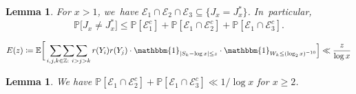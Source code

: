 \documentclass[10pt,a4paper]{article}
\newcommand{\ZZ}{\mathbb{Z}}
\newcommand{\PP}{\mathbb{P}}
\newcommand{\EE}{\mathbb{E}}
\newcommand{\one}{\mathbbm{1}}
\newcommand{\EC}{\mathcal{E}}
\newcommand{\bg}{\big}
\newcommand{\bgg}{\Big}
\newcommand{\bggg}{\bigg}
\theoremstyle{plain}
\newtheorem{lem}[cor]{Lemma}
\theoremstyle{definition}
\begin{document}
\begin{lem}
\label{lem:decomposition J neq J*}
For $x > 1$, we~have $\EC_1\cap \EC_2\cap \EC_3\subseteq \{ J_x = J_x^*\}$. In~particular,
\[
\PP\bg[J_x \ne J_x^*\bg] \le \PP[\EC_1^c] + \PP[\EC_1 \cap \EC_2^c] + \PP[\EC_1 \cap \EC_3^c].
\]
\end{lem}

\begin{equation}
\label{eq:E(z)}
E(z) \coloneqq \EE \bggg[\mathop{\sum\sum\sum}_{\substack{i, j, k \in \ZZ:\ i>j>k}}r(Y_i)r(Y_j) \cdot \one_{|S_k-\log x|\le z} \cdot \one_{W_k \le (\log_2x)^{-10}} \bgg] \ll \frac{z}{\log x}
\end{equation}

\begin{lem}
\label{lem:prob e2c e3c}
We have $\PP[\EC_1 \cap \EC_2^c] + \PP[\EC_1 \cap \EC_3^c] \ll 1/\log x$ for $x\ge2$.
\end{lem}
\end{document}
